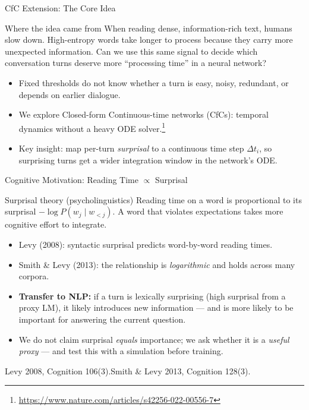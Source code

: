 \documentclass[aspectratio=169,11pt]{beamer}
\begin{document}
\begin{frame}{CfC Extension: The Core Idea}
  \begin{block}{Where the idea came from}
    When reading dense, information-rich text, humans slow down.
    High-entropy words take longer to process because they carry more
    unexpected information. Can we use this same signal to decide
    which conversation turns deserve more ``processing time'' in a neural network?
  \end{block}

  \vspace{0.4em}
  \begin{itemize}
    \item Fixed thresholds do not know whether a turn is easy, noisy, redundant, or depends on earlier dialogue.
    \item We explore Closed-form Continuous-time networks (CfCs): temporal dynamics without a heavy ODE solver.\footnote{\url{https://www.nature.com/articles/s42256-022-00556-7}}
    \item Key insight: map per-turn \emph{surprisal} to a continuous time step $\Delta t_i$, so surprising turns get a wider integration window in the network's ODE.
  \end{itemize}
\end{frame}

\begin{frame}{Cognitive Motivation: Reading Time $\propto$ Surprisal}
  \begin{block}{Surprisal theory (psycholinguistics)}
    Reading time on a word is proportional to its surprisal $-\log P(w_j \mid w_{<j})$.
    A word that violates expectations takes more cognitive effort to integrate.
  \end{block}

  \vspace{0.4em}
  \begin{itemize}
    \item Levy (2008): syntactic surprisal predicts word-by-word reading times.
    \item Smith \& Levy (2013): the relationship is \emph{logarithmic} and holds across many corpora.
    \item \textbf{Transfer to NLP:} if a turn is lexically surprising (high surprisal from a proxy LM), it likely introduces new information — and is more likely to be important for answering the current question.
    \item We do not claim surprisal \emph{equals} importance; we ask whether it is a \emph{useful proxy} — and test this with a simulation before training.
  \end{itemize}

  \vspace{0.3em}
  \footnotesize
  Levy 2008, Cognition 106(3).\quad Smith \& Levy 2013, Cognition 128(3).
\end{frame}
\end{document}
